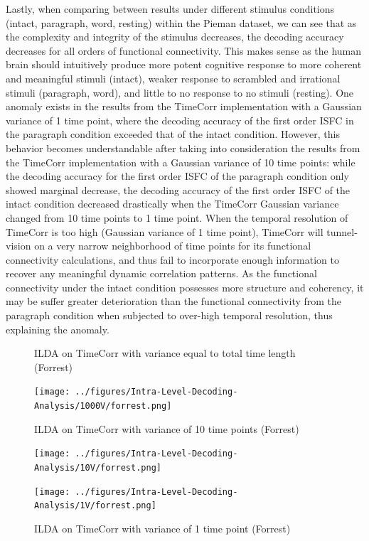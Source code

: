 \documentclass[11pt]{article}
\begin{document}
Lastly, when comparing between results under different stimulus conditions (intact, paragraph, word, resting) within the Pieman dataset, we can see that as the complexity and integrity of the stimulus decreases, the decoding accuracy decreases for all orders of functional connectivity. This makes sense as the human brain should intuitively produce more potent cognitive response to more coherent and meaningful stimuli (intact), weaker response to scrambled and irrational stimuli (paragraph, word), and little to no response to no stimuli (resting). One anomaly exists in the results from the TimeCorr implementation with a Gaussian variance of 1 time point, where the decoding accuracy of the first order ISFC in the paragraph condition exceeded that of the intact condition. However, this behavior becomes understandable after taking into consideration the results from the TimeCorr implementation with a Gaussian variance of 10 time points: while the decoding accuracy for the first order ISFC of the paragraph condition only showed marginal decrease, the decoding accuracy of the first order ISFC of the intact condition decreased drastically when the TimeCorr Gaussian variance changed from 10 time points to 1 time point. When the temporal resolution of TimeCorr is too high (Gaussian variance of 1 time point), TimeCorr will tunnel-vision on a very narrow neighborhood of time points for its functional connectivity calculations, and thus fail to incorporate enough information to recover any meaningful dynamic correlation patterns. As the functional connectivity under the intact condition possesses more structure and coherency, it may be suffer greater deterioration than the functional connectivity from the paragraph condition when subjected to over-high temporal resolution, thus explaining the anomaly.

\begin{figure}[!htb]
\caption{ILDA on TimeCorr with variance equal to total time length (Forrest)}
\centering
\texttt{[image: ../figures/Intra-Level-Decoding-Analysis/1000V/forrest.png]}
\label{fig:forrestDC1000}
\caption{ILDA on TimeCorr with variance of 10 time points (Forrest)}
\centering
\texttt{[image: ../figures/Intra-Level-Decoding-Analysis/10V/forrest.png]}
\label{fig:forrestDC10}
\caption{ILDA on TimeCorr with variance of 1 time point (Forrest)}
\centering
\texttt{[image: ../figures/Intra-Level-Decoding-Analysis/1V/forrest.png]}
\label{fig:forrestDC1}
\end{figure}
\end{document}
